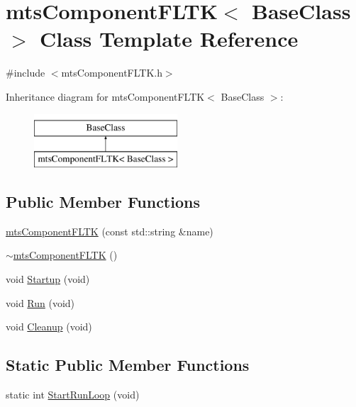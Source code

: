 \hypertarget{classmts_component_f_l_t_k}{}\section{mts\+Component\+F\+L\+T\+K$<$ Base\+Class $>$ Class Template Reference}
\label{classmts_component_f_l_t_k}


{\ttfamily \#include $<$mts\+Component\+F\+L\+T\+K.\+h$>$}

Inheritance diagram for mts\+Component\+F\+L\+T\+K$<$ Base\+Class $>$\+:\begin{figure}[H]
\begin{center}
\leavevmode
\includegraphics[height=2.000000cm]{d3/d56/classmts_component_f_l_t_k}
\end{center}
\end{figure}
\subsection*{Public Member Functions}
\begin{DoxyCompactItemize}
\item 
\hyperlink{classmts_component_f_l_t_k_a704219af0408a6490f6dd037dc875610}{mts\+Component\+F\+L\+T\+K} (const std\+::string \&name)
\item 
\hyperlink{classmts_component_f_l_t_k_a431ee9a69494cf3d8edeedb9039f7ddd}{$\sim$mts\+Component\+F\+L\+T\+K} ()
\item 
void \hyperlink{classmts_component_f_l_t_k_a1414000961f52e0ab76f141300e2fef1}{Startup} (void)
\item 
void \hyperlink{classmts_component_f_l_t_k_a80d9a8450d5f28207f644682a426b6b9}{Run} (void)
\item 
void \hyperlink{classmts_component_f_l_t_k_a448f78d704dbd18ff4b678eb19f037db}{Cleanup} (void)
\end{DoxyCompactItemize}
\subsection*{Static Public Member Functions}
\begin{DoxyCompactItemize}
\item 
static int \hyperlink{classmts_component_f_l_t_k_a0dca571982b439a230c32b38e1939da7}{Start\+Run\+Loop} (void)
\end{DoxyCompactItemize}


